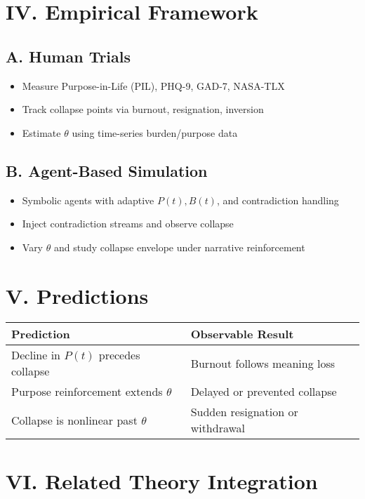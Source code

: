 \documentclass[12pt]{article}
\begin{document}
\section*{IV. Empirical Framework}

\subsection*{A. Human Trials}
\begin{itemize}
  \item Measure Purpose-in-Life (PIL), PHQ-9, GAD-7, NASA-TLX
  \item Track collapse points via burnout, resignation, inversion
  \item Estimate \( \theta \) using time-series burden/purpose data
\end{itemize}

\subsection*{B. Agent-Based Simulation}
\begin{itemize}
  \item Symbolic agents with adaptive \( P(t), B(t) \), and contradiction handling
  \item Inject contradiction streams and observe collapse
  \item Vary \( \theta \) and study collapse envelope under narrative reinforcement
\end{itemize}

\section*{V. Predictions}

\begin{tabular}{ll}
\textbf{Prediction} & \textbf{Observable Result} \\
\hline
Decline in \( P(t) \) precedes collapse & Burnout follows meaning loss \\
Purpose reinforcement extends \( \theta \) & Delayed or prevented collapse \\
Collapse is nonlinear past \( \theta \) & Sudden resignation or withdrawal \\
\end{tabular}

\section*{VI. Related Theory Integration}
\end{document}
